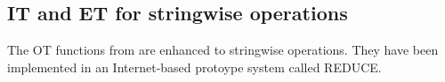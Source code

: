 \subsection{IT and ET for stringwise operations}
\label{otf:sun}

The OT functions from \cite{sun98a} are enhanced to stringwise operations. They have been implemented in an Internet-based protoype system called REDUCE.

